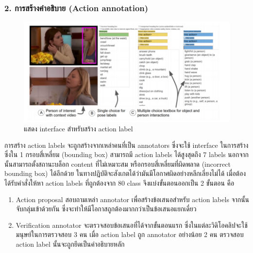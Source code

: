 \subsubsection*{2. การสร้างคำอธิบาย (Action annotation)}	
\begin{figure}[!ht]
	\centering
	\includegraphics[width=1\textwidth]{chapter2/images/vocab.png}
		\caption{แสดง interface สำหรับสร้าง action label}
    	\label{fig:vocab}
\end{figure}
การสร้าง action labels จะถูกสร้างจากเหล่าคนที่เป็น annotators ซึ่งจะใช้ interface ในการสร้าง ซึ่งใน 1 กรอบสี่เหลี่ยม (bounding box) สามารถมี action labels ได้สูงสุดถึง 7 labels นอกจากนั้นสามารถตั้งสถานะบล็อก content ที่ไม่เหมาะสม หรือกรอบสี่เหลี่ยมที่ผิดพลาด (incorrect bounding box) ได้อีกด้วย ในทางปฎิบัติจะสังเกตได้ว่ามันมีโอกาศผิดอย่างหลีกเลี่ยงไม่ได้ เมื่อต้องได้รับคำสั่งให้หา action labels ที่ถูกต้องจาก 80 class จึงแบ่งขั้นตอนออกเป็น 2 ขั้นตอน คือ
\begin{enumerate}
	\item Action proposal  สอบถามเหล่า annotator เพื่อสร้างข้อเสนอสำหรับ action labels จากนั้นจับกลุ่มเข้าด้วยกัน ซึ่งจะทำให้มีโอกาสถูกต้องมากกว่าเป็นข้อเสนอแยกเดี่ยว
	\setlength\itemsep{-0.25em}
	\item Verification annotator จะตรวจสอบข้อเสนอที่ได้จากขั้นตอนแรก ซึ่งในแต่ละวิดิโอคลิปจะใช้มนุษย์ในการตรวจสอบ 3 คน เมื่อ action label ถูก annotator อย่างน้อย 2 คน ตรวจสอบ action label นั้นจะถูกยึดเป็นคำอธิบายหลัก
\end{enumerate}
\clearpage
